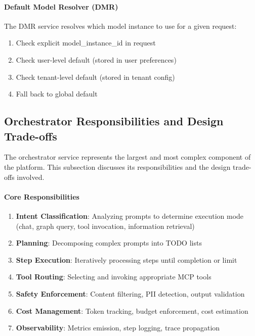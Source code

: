 \paragraph{Default Model Resolver (DMR)}
The DMR service resolves which model instance to use for a given request:
\begin{enumerate}
    \item Check explicit model\_instance\_id in request
    \item Check user-level default (stored in user preferences)
    \item Check tenant-level default (stored in tenant config)
    \item Fall back to global default
\end{enumerate}

\subsection{Orchestrator Responsibilities and Design Trade-offs}
\label{subsec:orchestrator-design}

The orchestrator service represents the largest and most complex component of the platform. This subsection discusses its responsibilities and the design trade-offs involved.

\paragraph{Core Responsibilities}
\begin{enumerate}
    \item \textbf{Intent Classification}: Analyzing prompts to determine execution mode (chat, graph query, tool invocation, information retrieval)
    \item \textbf{Planning}: Decomposing complex prompts into TODO lists
    \item \textbf{Step Execution}: Iteratively processing steps until completion or limit
    \item \textbf{Tool Routing}: Selecting and invoking appropriate MCP tools
    \item \textbf{Safety Enforcement}: Content filtering, PII detection, output validation
    \item \textbf{Cost Management}: Token tracking, budget enforcement, cost estimation
    \item \textbf{Observability}: Metrics emission, step logging, trace propagation
\end{enumerate}


